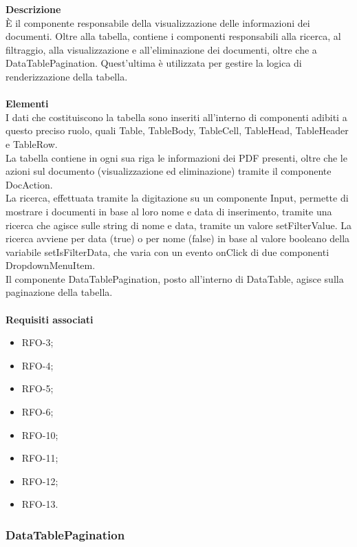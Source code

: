 \textbf{Descrizione}\\
È il componente responsabile della visualizzazione delle informazioni dei documenti. Oltre alla tabella, contiene i componenti responsabili alla ricerca, al filtraggio, alla visualizzazione e all'eliminazione dei documenti, oltre che a DataTablePagination. Quest'ultima è utilizzata per gestire la logica di renderizzazione della tabella.\\ \\
\textbf{Elementi}\\
I dati che costituiscono la tabella sono inseriti all'interno di componenti adibiti a questo preciso ruolo, quali Table, TableBody, TableCell, TableHead, TableHeader e TableRow.\\
La tabella contiene in ogni sua riga le informazioni dei PDF presenti, oltre che le azioni sul documento (visualizzazione ed eliminazione) tramite il componente DocAction.\\
La ricerca, effettuata tramite la digitazione su un componente Input, permette di mostrare i documenti in base al loro nome e data di inserimento, tramite una ricerca che agisce sulle string di nome e data, tramite un valore setFilterValue. La ricerca avviene per data (true) o per nome (false) in base al valore booleano della variabile setIsFilterData, che varia con un evento onClick di due componenti DropdownMenuItem.\\
Il componente DataTablePagination, posto all'interno di DataTable, agisce sulla paginazione della tabella.\\ \\
\textbf{Requisiti associati}
\begin{itemize}
    \item RFO-3;
    \item RFO-4;
    \item RFO-5;
    \item RFO-6;
    \item RFO-10;
    \item RFO-11;
    \item RFO-12;
    \item RFO-13.
\end{itemize}

\subsubsection{DataTablePagination}

